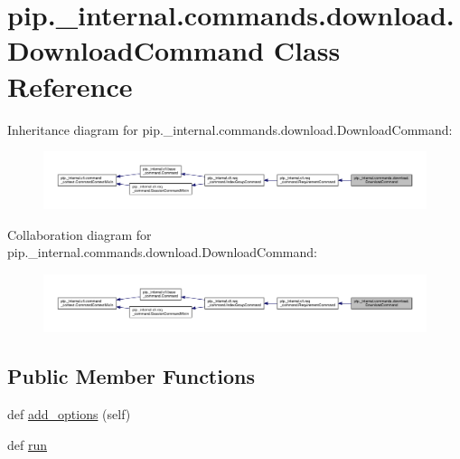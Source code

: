 \hypertarget{classpip_1_1__internal_1_1commands_1_1download_1_1DownloadCommand}{}\section{pip.\+\_\+internal.\+commands.\+download.\+Download\+Command Class Reference}
\label{classpip_1_1__internal_1_1commands_1_1download_1_1DownloadCommand}


Inheritance diagram for pip.\+\_\+internal.\+commands.\+download.\+Download\+Command\+:
\nopagebreak
\begin{figure}[H]
\begin{center}
\leavevmode
\includegraphics[width=350pt]{classpip_1_1__internal_1_1commands_1_1download_1_1DownloadCommand__inherit__graph}
\end{center}
\end{figure}


Collaboration diagram for pip.\+\_\+internal.\+commands.\+download.\+Download\+Command\+:
\nopagebreak
\begin{figure}[H]
\begin{center}
\leavevmode
\includegraphics[width=350pt]{classpip_1_1__internal_1_1commands_1_1download_1_1DownloadCommand__coll__graph}
\end{center}
\end{figure}
\subsection*{Public Member Functions}
\begin{DoxyCompactItemize}
\item 
def \hyperlink{classpip_1_1__internal_1_1commands_1_1download_1_1DownloadCommand_a47da54359286bf97f1361e4ee96fdc56}{add\+\_\+options} (self)
\item 
def \hyperlink{classpip_1_1__internal_1_1commands_1_1download_1_1DownloadCommand_a1b593945a9e6ec1765b36348e885eabd}{run}
\end{DoxyCompactItemize}
